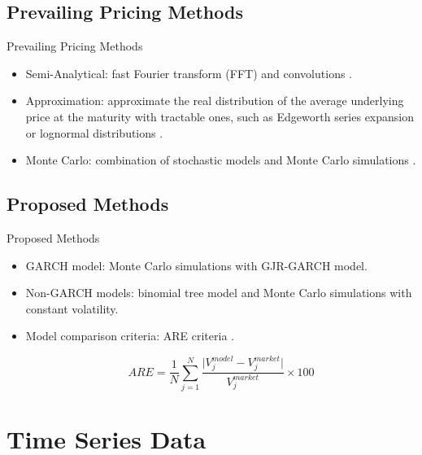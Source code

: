\documentclass[8pt]{beamer}
\numberwithin{equation}{section}
\begin{document}
\subsection{Prevailing Pricing Methods}
\begin{frame}{Prevailing Pricing Methods}
\begin{itemize}
\item Semi-Analytical: fast Fourier transform (FFT) and convolutions \cite{carverhill1990average} \cite{benhamou2000fast}.
\item Approximation: approximate the real distribution of the average underlying price at the maturity with tractable ones, such as Edgeworth series expansion \cite{turnbull1991quick} or lognormal distributions \cite{levy1992pricing}.
\item Monte Carlo: combination of stochastic models and Monte Carlo simulations \cite{kemna1990pricing}.
\end{itemize}
\end{frame}


\subsection{Proposed Methods}
\begin{frame}{Proposed Methods}
\begin{itemize}
\item GARCH model: Monte Carlo simulations with GJR-GARCH model.
\item Non-GARCH models: binomial tree model and Monte Carlo simulations with constant volatility.
\item Model comparison criteria: ARE criteria \cite{zhu2015model}.

\begin{equation}
ARE = \frac{1}{N} \sum^N_{j = 1} \frac{\vert V^{model}_j - V^{market}_j \vert}{V^{market}_j} \times 100
\end{equation}

\end{itemize}
\end{frame}

\section{Time Series Data}

\frame{\tableofcontents[currentsection]}
\end{document}
